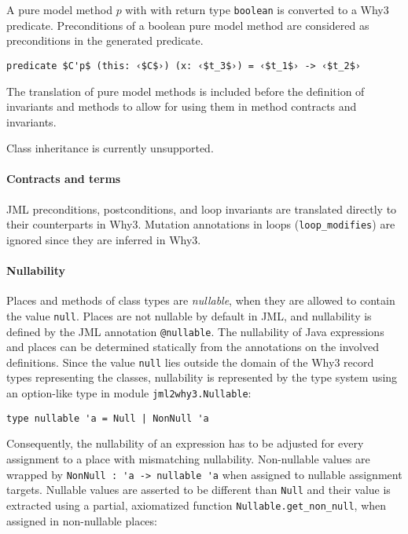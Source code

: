 \documentclass[a4paper]{report}
\begin{document}
A pure model method $p$ with with return type \lstinline{boolean} is converted
to a Why3 predicate. Preconditions of a boolean pure model method are considered
as preconditions in the generated predicate.
\begin{lstlisting}
predicate $C'p$ (this: ‹$C$›) (x: ‹$t_3$›) = ‹$t_1$› -> ‹$t_2$›
\end{lstlisting}

The translation of pure model methods is included before the definition of
invariants and methods to allow for using them in method contracts and
invariants.

Class inheritance is currently unsupported.

\paragraph{Contracts and terms}

JML preconditions, postconditions, and loop invariants are translated directly to their
counterparts in Why3. Mutation annotations in loops (\lstinline{loop_modifies}) are
ignored since they are inferred in Why3.

\paragraph{Nullability}
Places and methods of class types are \emph{nullable}, when they are allowed to
contain the value \texttt{null}. Places are not nullable by default in JML, and
nullability is defined by the JML annotation \lstinline{@nullable}. The
nullability of Java expressions and places can be determined statically from the
annotations on the involved definitions. Since the value \lstinline{null} lies
outside the domain of the Why3 record types representing the classes,
nullability is represented by the type system using an option-like type in
module \lstinline{jml2why3.Nullable}:
\begin{lstlisting}
type nullable 'a = Null | NonNull 'a
\end{lstlisting}

Consequently, the nullability of an expression has to be adjusted for every
assignment to a place with mismatching nullability. Non-nullable values are
wrapped by \lstinline{NonNull : 'a -> nullable 'a} when assigned to nullable
assignment targets. Nullable values are asserted to be different than
\lstinline{Null} and their value is extracted using a partial, axiomatized
function \lstinline{Nullable.get_non_null}, when assigned in non-nullable
places:
\end{document}
